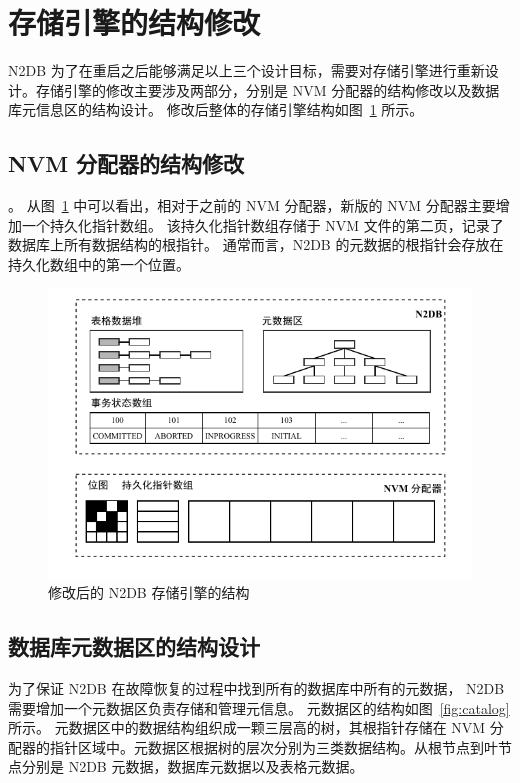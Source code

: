 \section{存储引擎的结构修改}

N2DB 为了在重启之后能够满足以上三个设计目标，需要对存储引擎进行重新设计。存储引擎的修改主要涉及两部分，分别是 NVM 分配器的结构修改以及数据库元信息区的结构设计。
修改后整体的存储引擎结构如图~\ref{fig:nvm-allocator} 所示。

\subsection{NVM 分配器的结构修改}。
从图~\ref{fig:nvm-allocator} 中可以看出，相对于之前的 NVM 分配器，新版的 NVM 分配器主要增加一个持久化指针数组。
该持久化指针数组存储于 NVM 文件的第二页，记录了数据库上所有数据结构的根指针。
通常而言，N2DB 的元数据的根指针会存放在持久化数组中的第一个位置。

\begin{figure}[ht]
    \centering
    \includegraphics[width=1\linewidth]{figures/new-nvm-allocator}
    \caption{修改后的 N2DB 存储引擎的结构}
    \label{fig:nvm-allocator}
\end{figure}

\subsection{数据库元数据区的结构设计}

为了保证 N2DB 在故障恢复的过程中找到所有的数据库中所有的元数据， N2DB 需要增加一个元数据区负责存储和管理元信息。
元数据区的结构如图~\ref{fig:catalog} 所示。
元数据区中的数据结构组织成一颗三层高的树，其根指针存储在 NVM 分配器的指针区域中。元数据区根据树的层次分别为三类数据结构。从根节点到叶节点分别是 N2DB 元数据，数据库元数据以及表格元数据。

